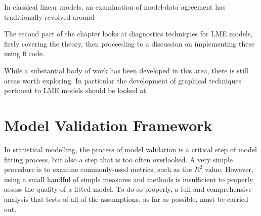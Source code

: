 \documentclass[12pt, a4paper]{report}
\theoremstyle{plain}
\theoremstyle{definition}
\theoremstyle{remark}
\begin{document}
In classical linear models, an examination of model-data agreement has traditionally revolved around

The second part of the chapter looks at diagnostics techniques for LME models, firsly covering the theory, then proceeding to a discussion on 
implementing these using \texttt{R} code.

While a substantial body of work has been developed in this area, there is still areas worth exploring. 
In particular the development of graphical techniques pertinent to LME models should be looked at.




%
%
%
%










\newpage
\section{Model Validation Framework}
In statistical modelling, the process of model validation is a critical step of model fitting process, but also a step that is too often overlooked. A very simple procedure is to examine commonly-used
metrics, such as the $R^2$ value. However, using a small handful of simple measures and methods is insufficient to properly assess the quality of a fitted model. To do so properly, a full and comprehensive
analysis that tests of all of the assumptions, as far as possible, must be carried out.
\end{document}
